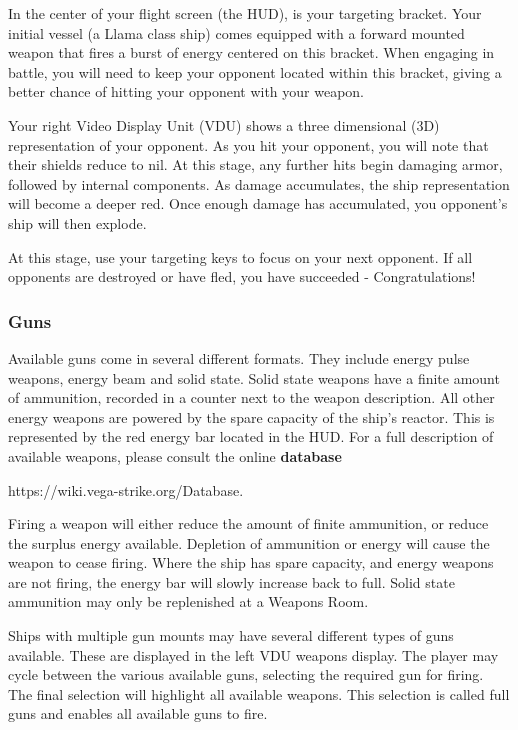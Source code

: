 \documentclass{article}
\begin{document}
In the center of your flight screen (the HUD), is your targeting bracket. Your initial vessel (a Llama class ship) comes equipped with a forward mounted weapon that fires a burst of energy centered on this bracket. When engaging in battle, you will need to keep your opponent located within this bracket, giving a better chance of hitting your opponent with your weapon. 


Your right Video Display Unit (VDU) shows a three dimensional (3D) representation of your opponent. As you hit your opponent, you will note that their shields reduce to nil. At this stage, any further hits begin damaging armor, followed by internal components. As damage accumulates, the ship representation will become a deeper red. Once enough damage has accumulated, you opponent's ship will then explode. 


At this stage, use your targeting keys to focus on your next opponent. If all opponents are destroyed or have fled, you have succeeded - Congratulations! 

\subsubsection{ Guns }

Available guns come in several different formats. They include energy pulse weapons, energy beam and solid state. Solid state weapons have a finite amount of ammunition, recorded in a counter next to the weapon description. All other energy weapons are powered by the spare capacity of the ship's reactor. This is represented by the red energy bar located in the HUD. For a full description of available weapons, please consult the online \textbf{database} 


https://wiki.vega-strike.org/Database.

Firing a weapon will either reduce the amount of finite ammunition, or reduce the surplus energy available. Depletion of ammunition or energy will cause the weapon to cease firing. Where the ship has spare capacity, and energy weapons are not firing, the energy bar will slowly increase back to full. Solid state ammunition may only be replenished at a Weapons Room. 


Ships with multiple gun mounts may have several different types of guns available. These are displayed in the left VDU weapons display. The player may cycle between the various available guns, selecting the required gun for firing. The final selection will highlight all available weapons. This selection is called full guns and enables all available guns to fire. 
\end{document}
